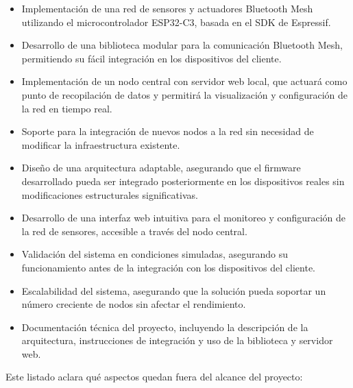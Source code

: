 \documentclass[
11pt, %
]{charter}
\begin{document}
\begin{itemize}
\item Implementación de una red de sensores y actuadores Bluetooth Mesh utilizando el microcontrolador ESP32-C3, basada en el SDK de Espressif.
\item Desarrollo de una biblioteca modular para la comunicación Bluetooth Mesh, permitiendo su fácil integración en los dispositivos del cliente.
\item Implementación de un nodo central con servidor web local, que actuará como punto de recopilación de datos y permitirá la visualización y configuración de la red en tiempo real.
\item Soporte para la integración de nuevos nodos a la red sin necesidad de modificar la infraestructura existente.
\item Diseño de una arquitectura adaptable, asegurando que el firmware desarrollado pueda ser integrado posteriormente en los dispositivos reales sin modificaciones estructurales significativas.
\item Desarrollo de una interfaz web intuitiva para el monitoreo y configuración de la red de sensores, accesible a través del nodo central.
\item Validación del sistema en condiciones simuladas, asegurando su funcionamiento antes de la integración con los dispositivos del cliente.
\item Escalabilidad del sistema, asegurando que la solución pueda soportar un número creciente de nodos sin afectar el rendimiento.
\item Documentación técnica del proyecto, incluyendo la descripción de la arquitectura, instrucciones de integración y uso de la biblioteca y servidor web.

\end{itemize}



Este listado aclara qué aspectos quedan fuera del alcance del proyecto:
\end{document}
